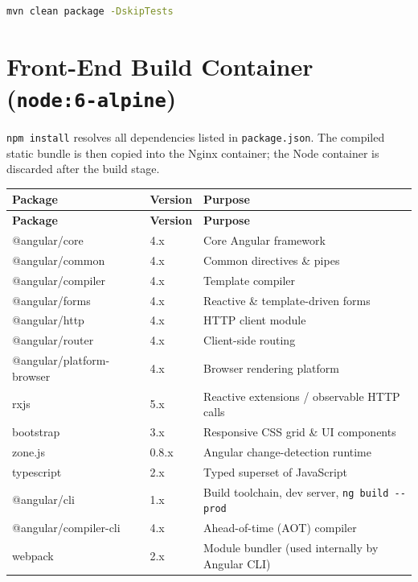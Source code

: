 \documentclass[12pt,letterpaper]{article}
\begin{document}
\begin{lstlisting}[language=bash]
mvn clean package -DskipTests
\end{lstlisting}

\section{Front-End Build Container \textnormal{\small(\texttt{node:6-alpine})}}

\texttt{npm install} resolves all dependencies listed in \texttt{package.json}.
The compiled static bundle is then copied into the Nginx container; the Node
container is discarded after the build stage.

\vspace{0.5em}
\begin{longtable}{p{5.5cm} p{1.8cm} p{6cm}}
  \rowcolor{headerblue}
  \color{white}\textbf{Package} &
  \color{white}\textbf{Version} &
  \color{white}\textbf{Purpose} \\
  \endfirsthead
  \rowcolor{headerblue}
  \color{white}\textbf{Package} &
  \color{white}\textbf{Version} &
  \color{white}\textbf{Purpose} \\
  \endhead
  @angular/core              & 4.x   & Core Angular framework \\
  \rowcolor{rowshade}
  @angular/common            & 4.x   & Common directives \& pipes \\
  @angular/compiler          & 4.x   & Template compiler \\
  \rowcolor{rowshade}
  @angular/forms             & 4.x   & Reactive \& template-driven forms \\
  @angular/http              & 4.x   & HTTP client module \\
  \rowcolor{rowshade}
  @angular/router            & 4.x   & Client-side routing \\
  @angular/platform-browser  & 4.x   & Browser rendering platform \\
  \rowcolor{rowshade}
  rxjs                       & 5.x   & Reactive extensions / observable HTTP calls \\
  bootstrap                  & 3.x   & Responsive CSS grid \& UI components \\
  \rowcolor{rowshade}
  zone.js                    & 0.8.x & Angular change-detection runtime \\
  typescript                 & 2.x   & Typed superset of JavaScript \\
  \rowcolor{rowshade}
  @angular/cli               & 1.x   & Build toolchain, dev server, \texttt{ng build -{}-prod} \\
  @angular/compiler-cli      & 4.x   & Ahead-of-time (AOT) compiler \\
  \rowcolor{rowshade}
  webpack                    & 2.x   & Module bundler (used internally by Angular CLI) \\
\end{longtable}
\end{document}
